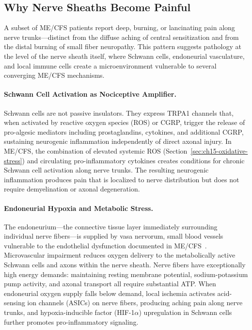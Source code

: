 \subsection{Why Nerve Sheaths Become Painful}
\label{subsec:ch15-nerve-sheath-pain}

A subset of ME/CFS patients report deep, burning, or lancinating pain along nerve trunks---distinct from the diffuse aching of central sensitization and from the distal burning of small fiber neuropathy. This pattern suggests pathology at the level of the nerve sheath itself, where Schwann cells, endoneurial vasculature, and local immune cells create a microenvironment vulnerable to several converging ME/CFS mechanisms.

\paragraph{Schwann Cell Activation as Nociceptive Amplifier.}
Schwann cells are not passive insulators. They express TRPA1 channels that, when activated by reactive oxygen species (ROS) or CGRP, trigger the release of pro-algesic mediators including prostaglandins, cytokines, and additional CGRP, sustaining neurogenic inflammation independently of direct axonal injury. In ME/CFS, the combination of elevated systemic ROS (Section~\ref{sec:ch15-oxidative-stress}) and circulating pro-inflammatory cytokines creates conditions for chronic Schwann cell activation along nerve trunks. The resulting neurogenic inflammation produces pain that is localized to nerve distribution but does not require demyelination or axonal degeneration.

\paragraph{Endoneurial Hypoxia and Metabolic Stress.}
The endoneurium---the connective tissue layer immediately surrounding individual nerve fibers---is supplied by vasa nervorum, small blood vessels vulnerable to the endothelial dysfunction documented in ME/CFS~\cite{heng2025mecfs}. Microvascular impairment reduces oxygen delivery to the metabolically active Schwann cells and axons within the nerve sheath. Nerve fibers have exceptionally high energy demands: maintaining resting membrane potential, sodium-potassium pump activity, and axonal transport all require substantial ATP. When endoneurial oxygen supply falls below demand, local ischemia activates acid-sensing ion channels (ASICs) on nerve fibers, producing aching pain along nerve trunks, and hypoxia-inducible factor (HIF-1$\alpha$) upregulation in Schwann cells further promotes pro-inflammatory signaling.

